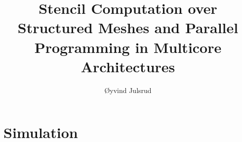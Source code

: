 \documentclass[USenglish]{ifimaster}  %
\title{Stencil Computation over Structured Meshes and Parallel Programming in Multicore Architectures}        %
\author{Øyvind Julsrud}                      %
\begin{document}
\ififorside{}
\maketitle{}

\tableofcontents{}











\chapter{Simulation} 

  

 





\printbibliography
\end{document}
